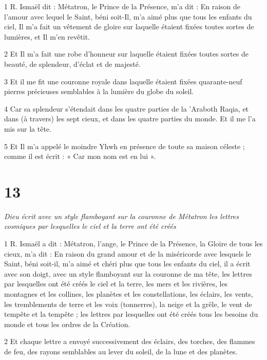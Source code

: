 \par 1 R. Ismaël dit : Métatron, le Prince de la Présence, m'a dit : En raison de l'amour avec lequel le Saint, béni soit-Il, m'a aimé plus que tous les enfants du ciel, Il m'a fait un vêtement de gloire sur laquelle étaient fixées toutes sortes de lumières, et Il m'en revêtit.

\par 2 Et Il m'a fait une robe d'honneur sur laquelle étaient fixées toutes sortes de beauté, de splendeur, d'éclat et de majesté.

\par 3 Et il me fit une couronne royale dans laquelle étaient fixées quarante-neuf pierres précieuses semblables à la lumière du globe du soleil.

\par 4 Car sa splendeur s'étendait dans les quatre parties de la 'Araboth Raqia, et dans (à travers) les sept cieux, et dans les quatre parties du monde. Et il me l'a mis sur la tête.

\par 5 Et Il m'a appelé le moindre Yhwh en présence de toute sa maison céleste ; comme il est écrit : « Car mon nom est en lui ».

\chapter{13}

\par \textit{Dieu écrit avec un style flamboyant sur la couronne de Métatron les lettres cosmiques par lesquelles le ciel et la terre ont été créés}

\par 1 R. Ismaël a dit : Métatron, l'ange, le Prince de la Présence, la Gloire de tous les cieux, m'a dit : En raison du grand amour et de la miséricorde avec lesquels le Saint, béni soit-il, m'a aimé et chéri plus que tous les enfants du ciel, il a écrit avec son doigt, avec un style flamboyant sur la couronne de ma tête, les lettres par lesquelles ont été créés le ciel et la terre, les mers et les rivières, les montagnes et les collines, les planètes et les constellations, les éclairs, les vents, les tremblements de terre et les voix (tonnerres), la neige et la grêle, le vent de tempête et la tempête ; les lettres par lesquelles ont été créés tous les besoins du monde et tous les ordres de la Création.

\par 2 Et chaque lettre a envoyé successivement des éclairs, des torches, des flammes de feu, des rayons semblables au lever du soleil, de la lune et des planètes.

